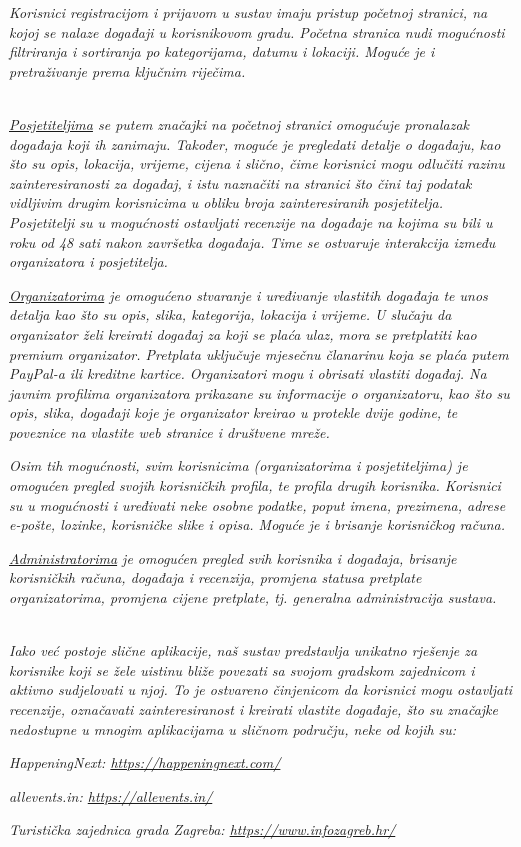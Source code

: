 		\textit{Korisnici registracijom i prijavom u sustav imaju pristup početnoj stranici, na kojoj se nalaze događaji u korisnikovom gradu. Početna stranica nudi mogućnosti filtriranja i sortiranja po kategorijama, datumu i lokaciji. Moguće je i pretraživanje prema ključnim riječima.}

		\\
		
		\textit{\underline{Posjetiteljima} se putem značajki na početnoj stranici omogućuje pronalazak događaja koji ih zanimaju. Također, moguće je pregledati detalje o događaju, kao što su opis, lokacija, vrijeme, cijena i slično, čime korisnici mogu odlučiti razinu zainteresiranosti za događaj, i istu naznačiti na stranici što čini taj podatak vidljivim drugim korisnicima u obliku broja zainteresiranih posjetitelja. Posjetitelji su u mogućnosti ostavljati recenzije na događaje na kojima su bili u roku od 48 sati nakon završetka događaja. Time se ostvaruje interakcija između organizatora i posjetitelja. }
		
		\textit{\underline{Organizatorima} je omogućeno stvaranje i uređivanje vlastitih događaja te unos detalja kao što su opis, slika, kategorija, lokacija i vrijeme. U slučaju da organizator želi kreirati događaj za koji se plaća ulaz, mora se pretplatiti kao premium organizator. Pretplata uključuje mjesečnu članarinu koja se plaća putem PayPal-a ili kreditne kartice. Organizatori mogu i obrisati vlastiti događaj. Na javnim profilima organizatora prikazane su informacije o organizatoru, kao što su opis, slika, događaji koje je organizator kreirao u protekle dvije godine, te poveznice na vlastite web stranice i društvene mreže.}

		\textit{Osim tih mogućnosti, svim korisnicima (organizatorima i posjetiteljima) je omogućen pregled svojih korisničkih profila, te profila drugih korisnika. Korisnici su u mogućnosti i uređivati neke osobne podatke, poput imena, prezimena, adrese e-pošte, lozinke, korisničke slike i opisa. Moguće je i brisanje korisničkog računa.}

		\textit{\underline{Administratorima} je omogućen pregled svih korisnika i događaja, brisanje korisničkih računa, događaja i recenzija, promjena statusa pretplate organizatorima, promjena cijene pretplate, tj. generalna administracija sustava.}

		\\
		
		\textit{Iako već postoje slične aplikacije, naš sustav predstavlja unikatno rješenje za korisnike koji se žele uistinu bliže povezati sa svojom gradskom zajednicom i aktivno sudjelovati u njoj. To je ostvareno činjenicom da korisnici mogu ostavljati recenzije, označavati zainteresiranost i kreirati vlastite događaje, što su značajke nedostupne u mnogim aplikacijama u sličnom području, neke od kojih su:}
		 \begin{packed_item}
			\item \textit{HappeningNext: \url{https://happeningnext.com/}}
			\item \textit{allevents.in: \url{https://allevents.in/}}
			\item \textit{Turistička zajednica grada Zagreba: \url{https://www.infozagreb.hr/}}
		 \end{packed_item}	

